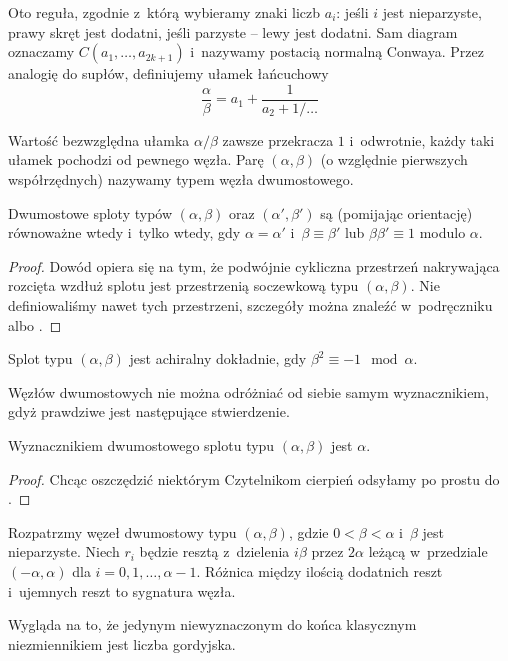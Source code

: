 Oto reguła, zgodnie z~którą wybieramy znaki liczb $a_i$:
jeśli $i$ jest nieparzyste, prawy skręt jest dodatni, jeśli parzyste -- lewy jest dodatni.
Sam diagram oznaczamy $C(a_1, \ldots, a_{2k+1})$ i~nazywamy postacią normalną Conwaya.
Przez analogię do supłów, definiujemy ułamek łańcuchowy
\[
    \frac \alpha \beta = a_1 + \frac{1}{a_2 + 1/\ldots}
\]

Wartość bezwzględna ułamka $\alpha/\beta$ zawsze przekracza $1$ i~odwrotnie, każdy taki ułamek pochodzi od pewnego węzła.
Parę $(\alpha, \beta)$ (o względnie pierwszych współrzędnych) nazywamy typem węzła dwumostowego.

\begin{proposition}
\label{prp:tangle_equivalence}
    Dwumostowe sploty typów $(\alpha, \beta)$ oraz $(\alpha', \beta')$ są (pomijając orientację) równoważne wtedy i~tylko wtedy, gdy $\alpha = \alpha'$ i~$\beta \equiv \beta'$ lub $\beta \beta'\equiv 1$ modulo $\alpha$.
\end{proposition}

\begin{proof}
    Dowód opiera się na tym, że podwójnie cykliczna przestrzeń nakrywająca rozcięta wzdłuż splotu jest przestrzenią soczewkową typu $(\alpha, \beta)$.
    Nie definiowaliśmy nawet tych przestrzeni, szczegóły można znaleźć w~podręczniku \cite{murasugi96} albo \cite{schubert56}.
\end{proof}

\begin{proposition}
\label{prp:chiral_tangles}
    Splot typu $(\alpha, \beta)$ jest achiralny dokładnie, gdy $\beta^2 \equiv -1 \mod \alpha$.
\end{proposition}

Węzłów dwumostowych nie można odróżniać od siebie samym wyznacznikiem, gdyż prawdziwe jest następujące stwierdzenie.

\begin{proposition}
\label{prp:tangle_determinant}
    Wyznacznikiem dwumostowego splotu typu $(\alpha, \beta)$ jest $\alpha$.
\end{proposition}

\begin{proof}
    Chcąc oszczędzić niektórym Czytelnikom cierpień odsyłamy po prostu do \cite{schubert56}.
\end{proof}

\begin{proposition}
\label{prp:tangle_signature}
    Rozpatrzmy węzeł dwumostowy typu $(\alpha, \beta)$, gdzie $0 < \beta < \alpha$ i~$\beta$ jest nieparzyste.
    Niech $r_i$ będzie resztą z~dzielenia $i\beta$ przez $2\alpha$ leżącą w~przedziale $(-\alpha, \alpha)$ dla $i = 0, 1, \ldots, \alpha - 1$.
    Różnica między ilością dodatnich reszt i~ujemnych reszt to sygnatura węzła.
\end{proposition}

Wygląda na to, że jedynym niewyznaczonym do końca klasycznym niezmiennikiem jest liczba gordyjska.

